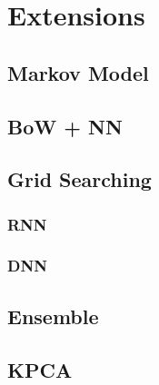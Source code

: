 \section{Extensions}
\label{sec:extensions}

  \subsection{Markov Model}
  \label{sec:markov_model}

  \subsection{BoW + NN}
  \label{sec:bow_nn}

  \subsection{Grid Searching}
  \label{sec:grid_search}

    \subsubsection{RNN}
    \label{sec:rnn-grid-search}

    \subsubsection{DNN}
    \label{sec:dnn-grid-search}

    \subsection{Ensemble}
    \label{sec:ensemble}

    \subsection{KPCA}
    \label{sec:kpca}
  